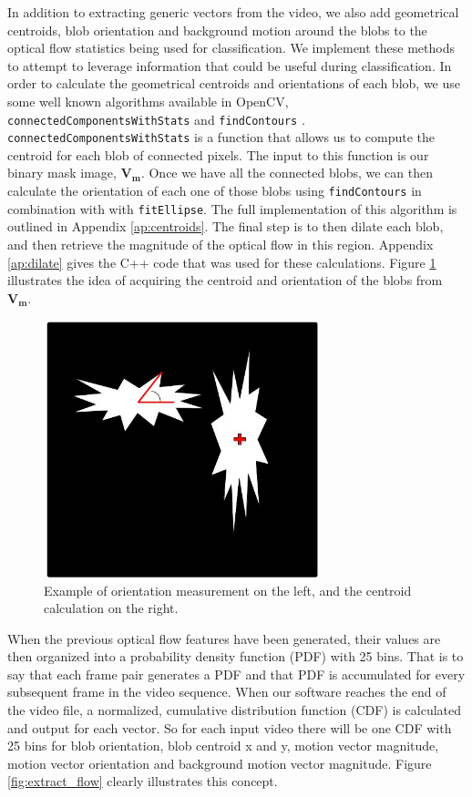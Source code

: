 In addition to extracting generic vectors from the video, we also add
geometrical centroids, blob orientation and background motion around the blobs
to the optical flow statistics being used for classification. We implement these
methods to attempt to leverage information that could be useful during
classification. In order to calculate the geometrical centroids and orientations
of each blob, we use some well known algorithms available in OpenCV,
\texttt{connectedComponentsWithStats} and \texttt{findContours}
\cite{itseez2015opencv}. \texttt{connectedComponentsWithStats} is a function
that allows us to compute the centroid for each blob of connected pixels. The
input to this function is our binary mask image, $\mathbf{V_m}$. Once we have
all the connected blobs, we can then calculate the orientation of each one of
those blobs using \texttt{findContours} in combination with with
\texttt{fitEllipse}. The full implementation of this algorithm is outlined in
Appendix \ref{ap:centroids}. The final step is to then dilate each blob, and
then retrieve the magnitude of the optical flow in this region. Appendix
\ref{ap:dilate} gives the C++ code that was used for these calculations.
Figure \ref{fig:orient_cent} illustrates the idea of acquiring
the centroid and orientation of the blobs from $\mathbf{V_m}$.

\begin{figure}[h]
  \centering
  \includegraphics[width=8cm]{figures/cent_and_orient}
  \caption{Example of orientation measurement on the left, and the centroid
  calculation on the right.}
  \label{fig:orient_cent}
\end{figure}

When the previous optical flow features have been generated, their values are
then organized into a probability density function (PDF) with 25 bins. That is
to say that each frame pair generates a PDF and that PDF is accumulated for
every subsequent frame in the video sequence. When our software reaches the end
of the video file, a normalized, cumulative distribution function (CDF) is
calculated and output for each vector. So for each input video there will be one
CDF with 25 bins for blob orientation, blob centroid x and y, motion vector
magnitude, motion vector orientation and background motion vector magnitude.
Figure \ref{fig:extract_flow} clearly illustrates this concept.

